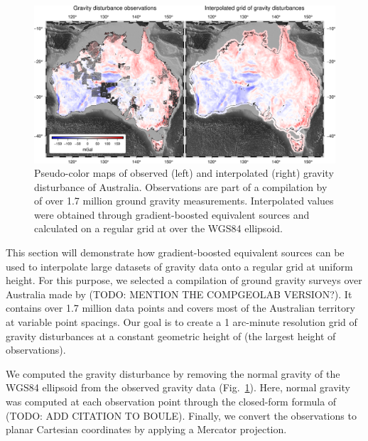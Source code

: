 \documentclass[twocolumn]{article}
\begin{document}
\begin{figure}
    \includegraphics[width=\linewidth]{figs/australia.png}
    \caption{
      Pseudo-color maps of observed (left) and
      interpolated (right) gravity disturbance of Australia.
      Observations are part of a compilation by \citet{wynne2018} of
      over 1.7 million ground gravity measurements.
      Interpolated values were obtained through gradient-boosted equivalent
      sources and calculated on a regular grid at \AustraliaEqlGridHeight{}
      over the WGS84 ellipsoid.
    }
    \label{fig:australia}
\end{figure}

This section will demonstrate how gradient-boosted equivalent sources can be
used to interpolate large datasets of gravity data onto a regular grid at
uniform height.
For this purpose, we selected a compilation of ground gravity surveys over
Australia made by \citet{wynne2018} (TODO: MENTION THE COMPGEOLAB VERSION?).
It contains over 1.7 million data points and covers most of the Australian
territory at variable point spacings.
Our goal is to create a 1 arc-minute resolution grid of gravity disturbances at
a constant geometric height of \AustraliaEqlGridHeight{} (the largest height of
observations).

We computed the gravity disturbance by removing the normal gravity of
the WGS84 ellipsoid from the observed gravity data (Fig.~\ref{fig:australia}).
Here, normal gravity was computed at each observation point through the
closed-form formula of \citet{ligotze2001} (TODO: ADD CITATION TO BOULE).
Finally, we convert the observations to planar Cartesian coordinates by
applying a Mercator projection.
\end{document}
